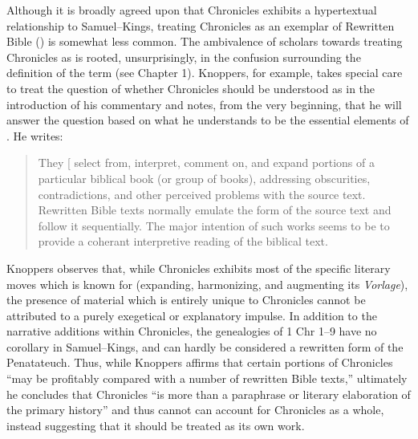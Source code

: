  Although it is broadly agreed upon that Chronicles exhibits a hypertextual relationship to Samuel--Kings, treating Chronicles as an exemplar of Rewritten Bible (\rwb) is somewhat less common.\autocites[Though, not particularly \emph{un}common:][]{campbell_zsengeller2014}{zahn_lim-collins2010}{bernstein_textus2005}[Alexander considers Chronicles to be a ``prototype'' of \rwb, see][100]{alexander_carson-williamson1988}[I have adopted the terminology of hyper-/hypotext from Genette. In this case, to say that Chronicles is a ``hypertext'' of Samuel--Kings is to say that it is derivative, but not a commentary on Samuel--Kings. See][5]{genette1997} The ambivalence of scholars towards treating Chronicles as \rwb is rooted, unsurprisingly, in the confusion surrounding the definition of the term (see Chapter 1). Knoppers, for example, takes special care to treat the question of whether Chronicles should be understood as \rwb in the introduction of his commentary and notes, from the very beginning, that he will answer the question based on what he understands to be the essential elements of \rwb.\autocite[ , 129--134]{knoppers2003} He writes: 

 \begin{quote} They {[}\rwb{]} select from, interpret, comment on, and expand portions of a particular biblical book (or group of books), addressing obscurities, contradictions, and other perceived problems with the source text. Rewritten Bible texts normally emulate the form of the source text and follow it sequentially. The major intention of such works seems to be to provide a coherant interpretive reading of the biblical text.\autocite[130]{knoppers2003} \end{quote} 

 Knoppers observes that, while Chronicles exhibits most of the specific literary moves which \rwb is known for (expanding, harmonizing, and augmenting its \emph{Vorlage}), the presence of material which is entirely unique to Chronicles cannot be attributed to a purely exegetical or explanatory impulse. In addition to the narrative additions within Chronicles, the genealogies of 1 Chr 1--9 have no corollary in Samuel--Kings, and can hardly be considered a rewritten form of the Penatateuch.\autocite[132]{knoppers2003} Thus, while Knoppers affirms that certain portions of Chronicles ``may be profitably compared with a number of rewritten Bible texts,''\autocite[131]{knoppers2003} ultimately he concludes that Chronicles ``is more than a paraphrase or literary elaboration of the primary history''\autocite[134]{knoppers2003} and thus \rwb cannot can account for Chronicles as a whole, instead suggesting that it should be treated as its own work.\autocite[131--134]{knoppers2003} 

